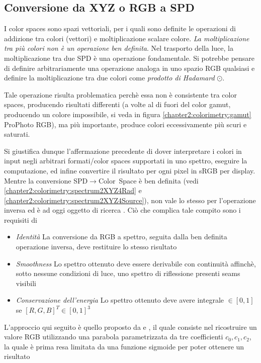 \subsection{Conversione da XYZ o RGB a SPD}
I color spaces sono spazi vettoriali, per i quali sono definite le operazioni di addizione tra colori (vettori) e moltiplicazione scalare colore.
\textit{La moltiplicazione tra pi\`u colori non \`e un operazione ben definita}. Nel trasporto della luce, la moltiplicazione tra due SPD \`e una 
operazione fondamentale. Si potrebbe pensare di definire arbitrariamente una operazione analoga in uno spazio RGB qualsiasi e definire la 
moltiplicazione tra due colori come \textit{prodotto di Hadamard} $\odot$.\par
Tale operazione risulta problematica perch\`e essa non \`e consistente tra color spaces, producendo risultati differenti (a volte al di fuori del 
color gamut, producendo un colore impossibile, si veda in figura \ref{chapter2:colorimetry:gamut} ProPhoto RGB), ma pi\`u importante, produce colori
eccessivamente pi\`u scuri e saturati.\par
Si giustifica dunque l'affermazione precedente di dover interpretare i colori in input negli arbitrari formati/color spaces supportati in uno spettro,
eseguire la computazione, ed infine convertire il risultato per ogni pixel in sRGB per display. Mentre la conversione 
\mbox{SPD$\rightarrow$Color Space} \`e ben definita (vedi \ref{chapter2:colorimetry:spectrum2XYZ4Rad} e 
\ref{chapter2:colorimetry:spectrum2XYZ4Source}), non vale lo stesso per l'operazione inversa ed \`e ad oggi oggetto di ricerca \cite{spectrum}.
Ci\`o che complica tale compito sono i requisiti di 
\begin{itemize}[topsep=0pt, noitemsep]
	\item[] \textit{Identit\`a} La conversione da RGB a spettro, seguita dalla ben definita operazione inversa, deve restituire lo stesso risultato
	\item[] \textit{Smoothness} Lo spettro ottenuto deve essere derivabile con continuit\`a affinch\`e, sotto nessune condizioni di luce, uno spettro
		di riflessione presenti seams visibili
	\item[] \textit{Conservazione dell'energia} Lo spettro ottenuto deve avere integrale $\in [0,1]$ se $[R, G, B]^T \in [0,1]^3$
\end{itemize}
L'approccio qui seguito \`e quello proposto da \cite{pharr} e \cite{rgb2spec}, il quale consiste nel ricostruire un valore RGB utilizzando una
parabola parametrizzata da tre coefficienti $c_0,c_1,c_2$, la quale \`e prima resa limitata da una funzione sigmoide per poter ottenere un risultato
